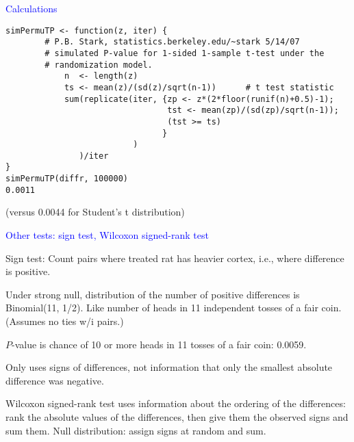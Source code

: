 \documentclass[landscape]{slides}
\begin{document}
\begin {slide}
{\textcolor{blue}{\sc Calculations}}

{\small
\begin{verbatim}
simPermuTP <- function(z, iter) {
        # P.B. Stark, statistics.berkeley.edu/~stark 5/14/07
        # simulated P-value for 1-sided 1-sample t-test under the 
        # randomization model.
            n  <- length(z)
            ts <- mean(z)/(sd(z)/sqrt(n-1))      # t test statistic
            sum(replicate(iter, {zp <- z*(2*floor(runif(n)+0.5)-1);
                                 tst <- mean(zp)/(sd(zp)/sqrt(n-1));
                                 (tst >= ts)
                                }
                          )
               )/iter
}
simPermuTP(diffr, 100000)
0.0011
\end{verbatim}
(versus 0.0044 for Student's t distribution)
}


\end{slide}


\begin {slide}
{\textcolor{blue}{\sc Other tests: sign test, Wilcoxon signed-rank test}}

{\textcolor{one}{Sign test:}}
Count pairs where treated rat has heavier cortex, i.e., where
difference is positive.

Under strong null, distribution of the number of positive differences
is Binomial(11, 1/2).  Like number of heads in 11 independent tosses
of a fair coin.  (Assumes no ties w/i pairs.)

$P$-value is chance of 10 or more heads in 11 tosses of a fair coin: 0.0059.

Only uses signs of differences, not information that only the smallest absolute 
difference was negative.

{\textcolor{one}{Wilcoxon signed-rank test}} uses information about the 
ordering of the
differences: rank the absolute values of the differences, then give them
the observed signs and sum them.  Null distribution: assign signs at random
and sum.


\end{slide}
\end{document}
